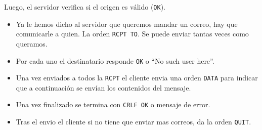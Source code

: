 Luego, el servidor verifica si el origen es válido (\texttt{OK}).
\begin{itemize}
\item Ya le hemos dicho al servidor que queremos mandar un correo, hay que comunicarle a quien. La orden \texttt{RCPT TO}. Se puede enviar tantas veces como queramos.
\item Por cada uno el destinatario responde \texttt{OK} o ``No such user here''.
\item Una vez enviados a todos la \texttt{RCPT} el cliente envia una orden \texttt{DATA} para indicar que  a continuación se envían los contenidos del mensaje.
\item Una vez finalizado se termina con \texttt{CRLF OK} o mensaje de error.
\item Tras el envio el cliente si no tiene que enviar mas correos, da la orden \texttt{QUIT}. 
\end{itemize}